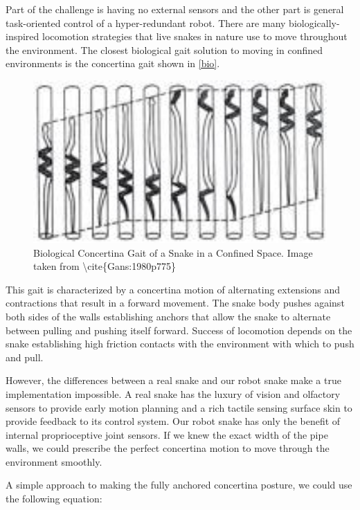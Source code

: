 Part of the challenge is having no external sensors and the other part is general task-oriented control of a hyper-redundant robot. There are many biologically-inspired locomotion strategies that live snakes in nature use to move throughout the environment. The closest biological gait solution to moving in confined environments is the concertina gait shown in \autoref{bio}.

\begin{figure}[htbp]
\centering
\includegraphics[keepaspectratio,width=400pt,height=0.75\textheight]{concertina_gait_Gans1980.jpg}
\caption{Biological Concertina Gait of a Snake in a Confined Space. Image taken from \textbackslash{}cite\{Gans:1980p775\}}
\label{bio}
\end{figure}



This gait is characterized by a concertina motion of alternating extensions and contractions that result in a forward movement. The snake body pushes against both sides of the walls establishing anchors that allow the snake to alternate between pulling and pushing itself forward. Success of locomotion depends on the snake establishing high friction contacts with the environment with which to push and pull.

However, the differences between a real snake and our robot snake make a true implementation impossible. A real snake has the luxury of vision and olfactory sensors to provide early motion planning and a rich tactile sensing surface skin to provide feedback to its control system. Our robot snake has only the benefit of internal proprioceptive joint sensors. If we knew the exact width of the pipe walls, we could prescribe the perfect concertina motion to move through the environment smoothly.

A simple approach to making the fully anchored concertina posture, we could use the following equation:


